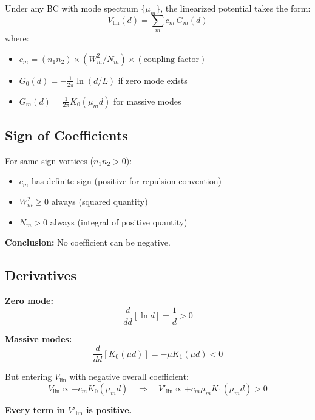 \documentclass[11pt,a4paper]{article}
\begin{document}
Under any BC with mode spectrum $\{\mu_m\}$, the linearized potential takes the form:
\begin{equation}
V_{\mathrm{lin}}(d) = \sum_m c_m \, G_m(d)
\end{equation}
where:
\begin{itemize}
    \item $c_m = (n_1 n_2) \times (W_m^2 / N_m) \times (\text{coupling factor})$
    \item $G_0(d) = -\frac{1}{2\pi} \ln(d/L)$ if zero mode exists
    \item $G_m(d) = \frac{1}{2\pi} K_0(\mu_m d)$ for massive modes
\end{itemize}

\subsection{Sign of Coefficients}

For same-sign vortices ($n_1 n_2 > 0$):
\begin{itemize}
    \item $c_m$ has definite sign (positive for repulsion convention)
    \item $W_m^2 \geq 0$ always (squared quantity)
    \item $N_m > 0$ always (integral of positive quantity)
\end{itemize}

\textbf{Conclusion:} No coefficient can be negative.

\subsection{Derivatives}

\textbf{Zero mode:}
\begin{equation}
\frac{d}{dd}\left[\ln d\right] = \frac{1}{d} > 0
\end{equation}

\textbf{Massive modes:}
\begin{equation}
\frac{d}{dd}\left[K_0(\mu d)\right] = -\mu K_1(\mu d) < 0
\end{equation}

But entering $V_{\mathrm{lin}}$ with negative overall coefficient:
\begin{equation}
V_{\mathrm{lin}} \propto -c_m K_0(\mu_m d)
\quad\Rightarrow\quad
V'_{\mathrm{lin}} \propto +c_m \mu_m K_1(\mu_m d) > 0
\end{equation}

\textbf{Every term in $V'_{\mathrm{lin}}$ is positive.}
\end{document}
